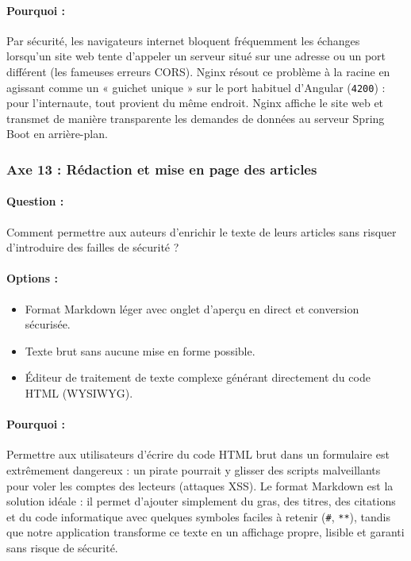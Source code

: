\documentclass[11pt,a4paper]{article}
\begin{document}
\paragraph{Pourquoi :} Par sécurité, les navigateurs internet bloquent fréquemment les échanges lorsqu'un site web tente d'appeler un serveur situé sur une adresse ou un port différent (les fameuses erreurs CORS). Nginx résout ce problème à la racine en agissant comme un « guichet unique » sur le port habituel d'Angular (\texttt{4200}) : pour l'internaute, tout provient du même endroit. Nginx affiche le site web et transmet de manière transparente les demandes de données au serveur Spring Boot en arrière-plan.

\subsubsection{Axe 13 : Rédaction et mise en page des articles}
\paragraph{Question :} Comment permettre aux auteurs d'enrichir le texte de leurs articles sans risquer d'introduire des failles de sécurité ?
\paragraph{Options :}
\begin{itemize}
    \item[$\boxtimes$] Format Markdown léger avec onglet d'aperçu en direct et conversion sécurisée.
    \item[$\square$] Texte brut sans aucune mise en forme possible.
    \item[$\square$] Éditeur de traitement de texte complexe générant directement du code HTML (WYSIWYG).
\end{itemize}
\paragraph{Pourquoi :} Permettre aux utilisateurs d'écrire du code HTML brut dans un formulaire est extrêmement dangereux : un pirate pourrait y glisser des scripts malveillants pour voler les comptes des lecteurs (attaques XSS). Le format Markdown est la solution idéale : il permet d'ajouter simplement du gras, des titres, des citations et du code informatique avec quelques symboles faciles à retenir (\texttt{\#}, \texttt{**}), tandis que notre application transforme ce texte en un affichage propre, lisible et garanti sans risque de sécurité.
\end{document}

